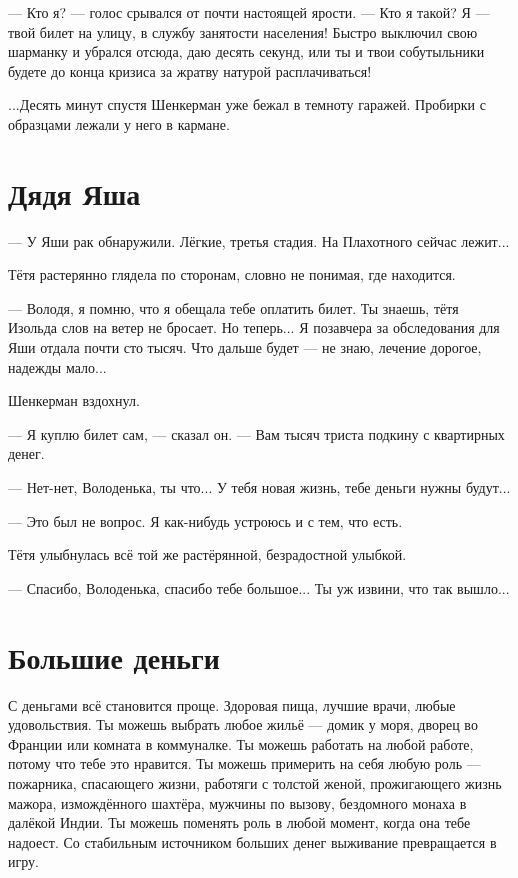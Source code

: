\documentclass[a4paper,10pt,fleqn]{book}\usepackage{polyglossia}\setdefaultlanguage{english}\setotherlanguage{russian}\defaultfontfeatures{Ligatures=TeX,Mapping=tex-text} \usepackage{xcolor}\definecolor{lightgray}{HTML}{bbbbbb}\color{lightgray}\newcommand{\ml}[3]{\textcolor{black}{#3}}
\begin{document}
--- Кто я? --- голос срывался от почти настоящей ярости.
--- Кто я такой?
Я --- твой билет на улицу, в службу занятости населения!
Быстро выключил свою шарманку и убрался отсюда, даю десять секунд, или ты и твои собутыльники будете до конца кризиса за жратву натурой расплачиваться!

...Десять минут спустя Шенкерман уже бежал в темноту гаражей.
Пробирки с образцами лежали у него в кармане.

\section{Дядя Яша}

--- У Яши рак обнаружили.
Лёгкие, третья стадия.
На Плахотного сейчас лежит...

Тётя растерянно глядела по сторонам, словно не понимая, где находится.

--- Володя, я помню, что я обещала тебе оплатить билет.
Ты знаешь, тётя Изольда слов на ветер не бросает.
Но теперь...
Я позавчера за обследования для Яши отдала почти сто тысяч.
Что дальше будет --- не знаю, лечение дорогое, надежды мало...

Шенкерман вздохнул.

--- Я куплю билет сам, --- сказал он.
--- Вам тысяч триста подкину с квартирных денег.

--- Нет-нет, Володенька, ты что...
У тебя новая жизнь, тебе деньги нужны будут...

--- Это был не вопрос.
Я как-нибудь устроюсь и с тем, что есть.

Тётя улыбнулась всё той же растёрянной, безрадостной улыбкой.

--- Спасибо, Володенька, спасибо тебе большое...
Ты уж извини, что так вышло...

\section{Большие деньги}

С деньгами всё становится проще.
Здоровая пища, лучшие врачи, любые удовольствия.
Ты можешь выбрать любое жильё --- домик у моря, дворец во Франции или комната в коммуналке.
Ты можешь работать на любой работе, потому что тебе это нравится.
Ты можешь примерить на себя любую роль --- пожарника, спасающего жизни, работяги с толстой женой, прожигающего жизнь мажора, измождённого шахтёра, мужчины по вызову, бездомного монаха в далёкой Индии.
Ты можешь поменять роль в любой момент, когда она тебе надоест.
Со стабильным источником больших денег выживание превращается в игру.
\end{document}
